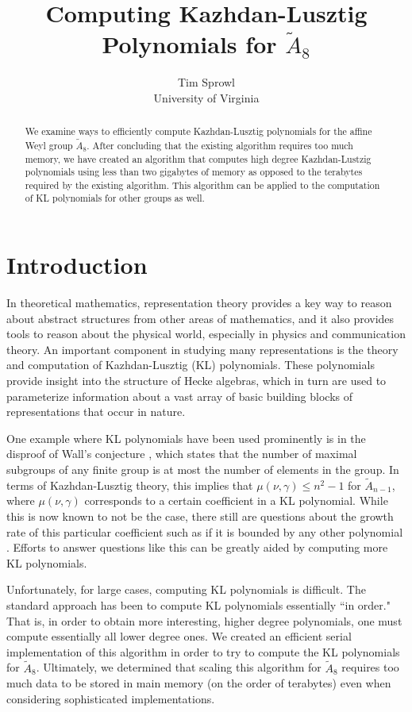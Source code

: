 \documentclass[12pt]{article} %
\title{Computing Kazhdan-Lusztig Polynomials for $\tilde A_8$ }
\author{Tim Sprowl\\University of Virginia}
\date{} %
\begin{document}
\maketitle

\begin{abstract}

We examine ways to efficiently compute Kazhdan-Lusztig polynomials for the affine Weyl group $\tilde A_8$. After concluding that the existing algorithm requires too much memory, we have created an algorithm that computes high degree Kazhdan-Lustzig polynomials using less than two gigabytes of memory as opposed to the terabytes required by the existing algorithm. This algorithm can be applied to the computation of KL polynomials for other groups as well.

\end{abstract}

\section{Introduction}

In theoretical mathematics, representation theory provides a key way to reason about abstract structures from other areas of mathematics, and it also provides tools to reason about the physical world, especially in physics and communication theory. An important component in studying many representations is the theory and computation of Kazhdan-Lusztig (KL) polynomials. These polynomials provide insight into the structure of Hecke algebras, which in turn are used to parameterize information about a vast array of basic building blocks of representations that occur in nature. 

One example where KL polynomials have been used prominently is in the disproof of Wall's conjecture \citep{wall61, liebeck07}, which states that the number of maximal subgroups of any finite group is at most the number of elements in the group. In terms of Kazhdan-Lusztig theory, this implies that $\mu(\nu,\gamma) \leq n^2-1$ for $\tilde A_{n-1}$, where $\mu(\nu,\gamma)$ corresponds to a certain coefficient in a KL polynomial. While this is now known to not be the case, there still are questions about the growth rate of this particular coefficient such as if it is bounded by any other polynomial \citep{guralnick12}. Efforts to answer questions like this can be greatly aided by computing more KL polynomials.

Unfortunately, for large cases, computing KL polynomials is difficult. The standard approach has been to compute KL polynomials essentially ``in order." That is, in order to obtain more interesting, higher degree polynomials, one must compute essentially all lower degree ones. We created an efficient serial implementation of this algorithm in order to try to compute the KL polynomials for $\tilde A_8$. 
Ultimately, we determined that scaling this algorithm for $\tilde A_8$ requires too much data to be stored in main memory (on the order of terabytes) even when considering sophisticated implementations. 
\end{document}
